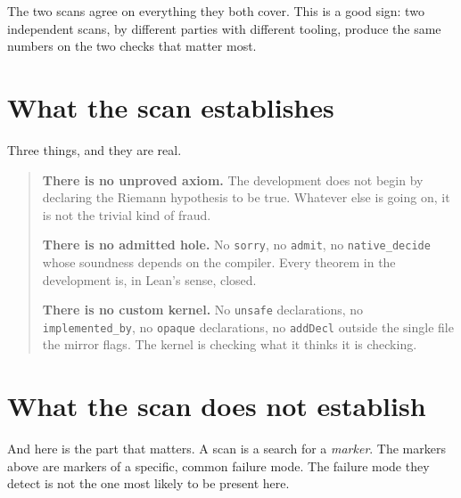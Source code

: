 The two scans agree on everything they both cover. This is a good sign: two
independent scans, by different parties with different tooling, produce the
same numbers on the two checks that matter most.

\section{What the scan establishes}Three things, and they are real.

\begin{quote}
\textbf{There is no unproved axiom.} The development does not begin by
declaring the Riemann hypothesis to be true. Whatever else is going on, it is
not the trivial kind of fraud.

\textbf{There is no admitted hole.} No \texttt{sorry}, no \texttt{admit}, no
\texttt{native\_decide} whose soundness depends on the compiler. Every theorem
in the development is, in Lean's sense, closed.

\textbf{There is no custom kernel.} No \texttt{unsafe} declarations, no
\texttt{implemented\_by}, no \texttt{opaque} declarations, no
\texttt{addDecl} outside the single file the mirror flags. The kernel is
checking what it thinks it is checking.
\end{quote}

\section{What the scan does not establish}And here is the part that matters. A scan is a search for a \emph{marker}. The
markers above are markers of a specific, common failure mode. The failure mode
they detect is not the one most likely to be present here.

